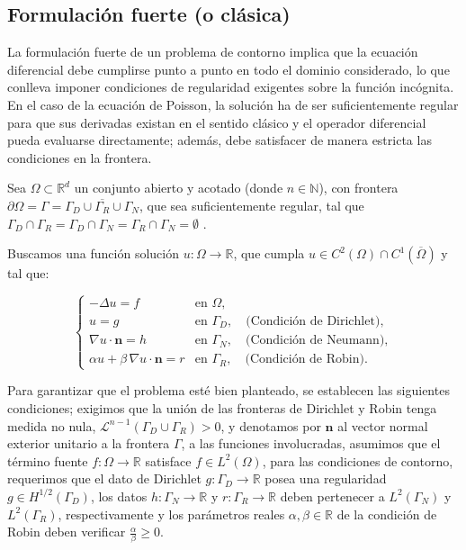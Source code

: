 \documentclass[11pt]{book}
\theoremstyle{plain} %
\theoremstyle{definition} %
\theoremstyle{definition} %
\begin{document}
\subsection{Formulación fuerte (o clásica)}

La formulación fuerte de un problema de contorno implica que la ecuación diferencial debe cumplirse punto a punto en todo el dominio 
considerado, lo que conlleva imponer condiciones de regularidad exigentes sobre la función incógnita. 
En el caso de la ecuación de Poisson, la solución ha de ser suficientemente regular para que sus derivadas existan 
en el sentido clásico y el operador diferencial pueda evaluarse directamente; además, debe satisfacer de manera estricta las condiciones en la frontera. 

Sea $\Omega \subset \mathbb{R}^d$ un conjunto abierto y acotado (donde $n \in \mathbb{N}$),
     con frontera $\partial\Omega = \Gamma = \overline{\Gamma_D \cup \Gamma_R \cup \Gamma_N}$, que sea suficientemente regular, tal que $\Gamma_D \cap \Gamma_R = \Gamma_D \cap \Gamma_N =  \Gamma_R \cap \Gamma_N = \emptyset$ .

Buscamos una función solución $u: \Omega \to \mathbb{R}$, que cumpla $u \in C^2(\Omega) \cap C^1(\overline{\Omega})$ y tal que: 

\vspace{-0.2cm}

\[
\begin{cases}
- \Delta u = f & \text{en } \Omega, \\[6pt]
u = g & \text{en } \Gamma_D, \quad \text{(Condición de Dirichlet)}, \\[6pt]
\nabla u \cdot \mathbf{n} = h & \text{en } \Gamma_N, \quad \text{(Condición de Neumann)}, \\[6pt]
\alpha u + \beta \, \nabla u \cdot \mathbf{n} = r & \text{en } \Gamma_R, \quad \text{(Condición de Robin)}.
\end{cases}
\]


Para garantizar que el problema esté bien planteado, se establecen las siguientes condiciones;
exigimos que la unión de las fronteras de Dirichlet y Robin tenga medida no nula, $\mathcal{L}^{n-1}(\Gamma_D \cup \Gamma_R) > 0$, y denotamos por $\mathbf{n}$ al vector normal exterior unitario a la frontera $\Gamma$,
a las funciones involucradas, asumimos que el término fuente $f: \Omega \to \mathbb{R}$ satisface $f \in L^2(\Omega)$,
para las condiciones de contorno, requerimos que el dato de Dirichlet $g: \Gamma_D \to \mathbb{R}$ posea una regularidad $g \in H^{1/2}(\Gamma_D)$,
los datos $h: \Gamma_N \to \mathbb{R}$ y $r: \Gamma_R \to \mathbb{R}$ deben pertenecer a $L^2(\Gamma_N)$ y $L^2(\Gamma_R)$, respectivamente y
los parámetros reales $\alpha, \beta \in \mathbb{R}$ de la condición de Robin deben verificar $\frac{\alpha}{\beta} \geq 0$.
\end{document}
